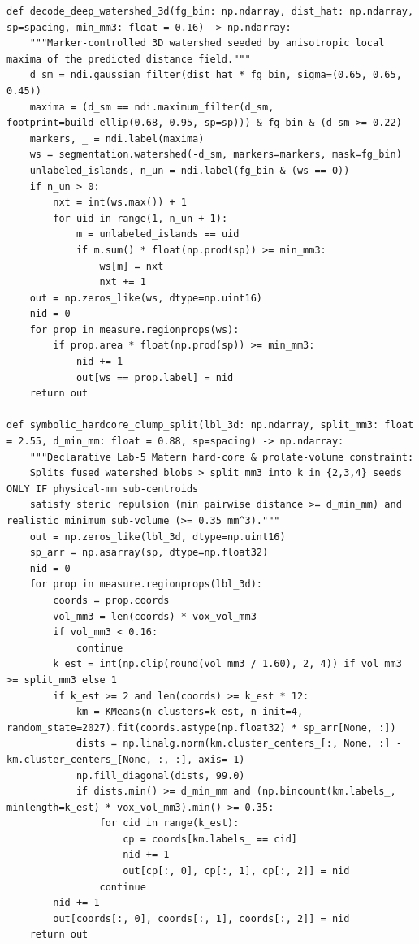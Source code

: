\documentclass[10pt,a4paper]{article}
\begin{document}
\begin{codebox}[{In [4] $\cdot$ Python --- Step 4 -- Controlled 5-model ablation study (SSL warm-start, Organ-GPS, p=1 vs p=3, calibration)}]
\begin{lstlisting}[style=pybmed]
def decode_deep_watershed_3d(fg_bin: np.ndarray, dist_hat: np.ndarray, sp=spacing, min_mm3: float = 0.16) -> np.ndarray:
    """Marker-controlled 3D watershed seeded by anisotropic local maxima of the predicted distance field."""
    d_sm = ndi.gaussian_filter(dist_hat * fg_bin, sigma=(0.65, 0.65, 0.45))
    maxima = (d_sm == ndi.maximum_filter(d_sm, footprint=build_ellip(0.68, 0.95, sp=sp))) & fg_bin & (d_sm >= 0.22)
    markers, _ = ndi.label(maxima)
    ws = segmentation.watershed(-d_sm, markers=markers, mask=fg_bin)
    unlabeled_islands, n_un = ndi.label(fg_bin & (ws == 0))
    if n_un > 0:
        nxt = int(ws.max()) + 1
        for uid in range(1, n_un + 1):
            m = unlabeled_islands == uid
            if m.sum() * float(np.prod(sp)) >= min_mm3:
                ws[m] = nxt
                nxt += 1
    out = np.zeros_like(ws, dtype=np.uint16)
    nid = 0
    for prop in measure.regionprops(ws):
        if prop.area * float(np.prod(sp)) >= min_mm3:
            nid += 1
            out[ws == prop.label] = nid
    return out

def symbolic_hardcore_clump_split(lbl_3d: np.ndarray, split_mm3: float = 2.55, d_min_mm: float = 0.88, sp=spacing) -> np.ndarray:
    """Declarative Lab-5 Matern hard-core & prolate-volume constraint:
    Splits fused watershed blobs > split_mm3 into k in {2,3,4} seeds ONLY IF physical-mm sub-centroids
    satisfy steric repulsion (min pairwise distance >= d_min_mm) and realistic minimum sub-volume (>= 0.35 mm^3)."""
    out = np.zeros_like(lbl_3d, dtype=np.uint16)
    sp_arr = np.asarray(sp, dtype=np.float32)
    nid = 0
    for prop in measure.regionprops(lbl_3d):
        coords = prop.coords
        vol_mm3 = len(coords) * vox_vol_mm3
        if vol_mm3 < 0.16:
            continue
        k_est = int(np.clip(round(vol_mm3 / 1.60), 2, 4)) if vol_mm3 >= split_mm3 else 1
        if k_est >= 2 and len(coords) >= k_est * 12:
            km = KMeans(n_clusters=k_est, n_init=4, random_state=2027).fit(coords.astype(np.float32) * sp_arr[None, :])
            dists = np.linalg.norm(km.cluster_centers_[:, None, :] - km.cluster_centers_[None, :, :], axis=-1)
            np.fill_diagonal(dists, 99.0)
            if dists.min() >= d_min_mm and (np.bincount(km.labels_, minlength=k_est) * vox_vol_mm3).min() >= 0.35:
                for cid in range(k_est):
                    cp = coords[km.labels_ == cid]
                    nid += 1
                    out[cp[:, 0], cp[:, 1], cp[:, 2]] = nid
                continue
        nid += 1
        out[coords[:, 0], coords[:, 1], coords[:, 2]] = nid
    return out


\end{lstlisting}
\end{codebox}
\end{document}
